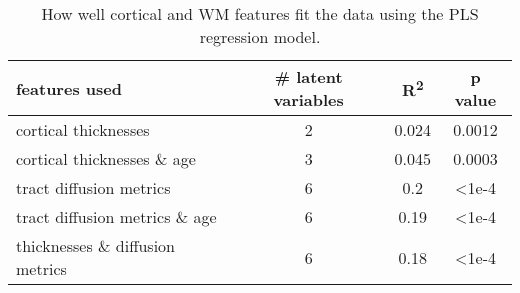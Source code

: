 \begin{table} 
    \begin{tabular}{ l | c c c }
        features used & # latent variables & R\textsuperscript{2} & p value \\
        \hline
        cortical thicknesses & 2 & 0.024 & 0.0012 \\
        cortical thicknesses \& age & 3 & 0.045 & 0.0003 \\
        tract diffusion metrics & 6 & 0.2 & \textless 1e-4 \\
        tract diffusion metrics \& age & 6 & 0.19 & \textless 1e-4 \\
        thicknesses \& diffusion metrics & 6 & 0.18 & \textless 1e-4 \\
    \end{tabular} 
    \caption{\label{tab:PLSmodels} How well cortical and WM features fit the data using the PLS regression model.} 
\end{table}
